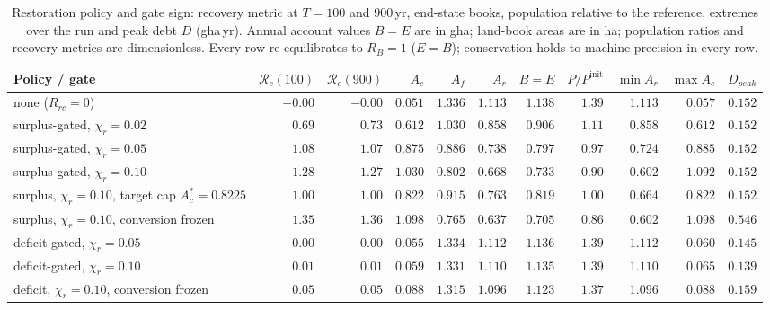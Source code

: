 \documentclass[11pt,a4paper]{article}
\begin{document}
\begin{table}[htbp]
\centering\scriptsize
\setlength{\tabcolsep}{2pt}
\caption{Restoration policy and gate sign: recovery metric at $T=100$ and $900$\,yr, end-state books, population relative to the reference, extremes over the run and peak debt $D$ (gha\,yr). Annual account values $B=E$ are in gha; land-book areas are in ha; population ratios and recovery metrics are dimensionless. Every row re-equilibrates to $R_B=1$ ($E=B$); conservation holds to machine precision in every row.}
\label{tab:si_gates}
\begin{tabular}{l r r r r r r r r r r}
\toprule
Policy / gate & $\mathcal R_c(100)$ & $\mathcal R_c(900)$ & $A_c$ & $A_f$ & $A_r$ & $B=E$ & $P/P^{\mathrm{init}}$ & $\min A_r$ & $\max A_c$ & $D_{peak}$ \\
\midrule
none ($R_{rc}=0$) & $-0.00$ & $-0.00$ & $0.051$ & $1.336$ & $1.113$ & $1.138$ & $1.39$ & $1.113$ & $0.057$ & $0.152$ \\
surplus-gated, $\chi_r=0.02$ & $0.69$ & $0.73$ & $0.612$ & $1.030$ & $0.858$ & $0.906$ & $1.11$ & $0.858$ & $0.612$ & $0.152$ \\
surplus-gated, $\chi_r=0.05$ & $1.08$ & $1.07$ & $0.875$ & $0.886$ & $0.738$ & $0.797$ & $0.97$ & $0.724$ & $0.885$ & $0.152$ \\
surplus-gated, $\chi_r=0.10$ & $1.28$ & $1.27$ & $1.030$ & $0.802$ & $0.668$ & $0.733$ & $0.90$ & $0.602$ & $1.092$ & $0.152$ \\
surplus, $\chi_r=0.10$, target cap $A_c^*=0.8225$ & $1.00$ & $1.00$ & $0.822$ & $0.915$ & $0.763$ & $0.819$ & $1.00$ & $0.664$ & $0.822$ & $0.152$ \\
surplus, $\chi_r=0.10$, conversion frozen & $1.35$ & $1.36$ & $1.098$ & $0.765$ & $0.637$ & $0.705$ & $0.86$ & $0.602$ & $1.098$ & $0.546$ \\
deficit-gated, $\chi_r=0.05$ & $0.00$ & $0.00$ & $0.055$ & $1.334$ & $1.112$ & $1.136$ & $1.39$ & $1.112$ & $0.060$ & $0.145$ \\
deficit-gated, $\chi_r=0.10$ & $0.01$ & $0.01$ & $0.059$ & $1.331$ & $1.110$ & $1.135$ & $1.39$ & $1.110$ & $0.065$ & $0.139$ \\
deficit, $\chi_r=0.10$, conversion frozen & $0.05$ & $0.05$ & $0.088$ & $1.315$ & $1.096$ & $1.123$ & $1.37$ & $1.096$ & $0.088$ & $0.159$ \\
\bottomrule
\end{tabular}
\end{table}
\end{document}
